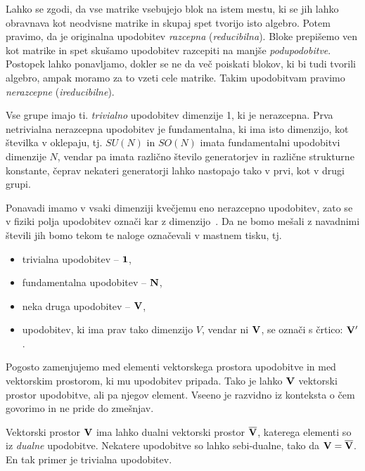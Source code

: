 Lahko se zgodi, da vse matrike vsebujejo blok na istem mestu, ki se jih lahko obravnava kot
neodvisne matrike in skupaj spet tvorijo isto algebro. Potem pravimo, da je originalna upodobitev
\emph{razcepna} (\emph{reducibilna}). Bloke prepišemo ven kot matrike in spet skušamo upodobitev
razcepiti na manjše \emph{podupodobitve}. Postopek lahko ponavljamo, dokler se ne da več poiskati
blokov, ki bi tudi tvorili algebro, ampak moramo za to vzeti cele matrike. Takim upodobitvam pravimo
\emph{nerazcepne} (\emph{ireducibilne}).

Vse grupe imajo ti. \emph{trivialno} upodobitev dimenzije 1, ki je nerazcepna. Prva netrivialna
nerazcepna upodobitev je fundamentalna, ki ima isto dimenzijo, kot številka v oklepaju, tj.
$SU(N)$ in $SO(N)$ imata fundamentalni upodobitvi dimenzije $N$, vendar pa imata različno število
generatorjev in različne strukturne konstante, čeprav nekateri generatorji lahko nastopajo tako v
prvi, kot v drugi grupi.

Ponavadi imamo v vsaki dimenziji kvečjemu eno nerazcepno upodobitev, zato se v fiziki polja
upodobitev označi kar z dimenzijo~\cite{slansky}. Da ne bomo mešali z navadnimi števili jih bomo tekom te
naloge označevali v mastnem tisku, tj.
\begin{itemize}
	\item{trivialna upodobitev -- $\mathbf{1}$,}
	\item{fundamentalna upodobitev -- $\mathbf{N}$,}
	\item{neka druga upodobitev -- $\mathbf{V}$,}
	\item{upodobitev, ki ima prav tako dimenzijo $V$, vendar ni $\mathbf{V}$, se označi s črtico: $\mathbf{V}'$.}
\end{itemize}
Pogosto zamenjujemo med elementi vektorskega prostora upodobitve in med vektorskim prostorom, ki mu
upodobitev pripada. Tako je lahko $\mathbf{V}$ vektorski prostor upodobitve, ali pa njegov element.
Vseeno je razvidno iz konteksta o čem govorimo in ne pride do zmešnjav.

Vektorski prostor $\mathbf{V}$ ima lahko dualni vektorski prostor $\overline{\mathbf{V}}$, katerega elementi so
iz \emph{dualne} upodobitve. Nekatere upodobitve so lahko sebi-dualne, tako da $\mathbf{V} = \overline{\mathbf{V}}$.
En tak primer je trivialna upodobitev.

